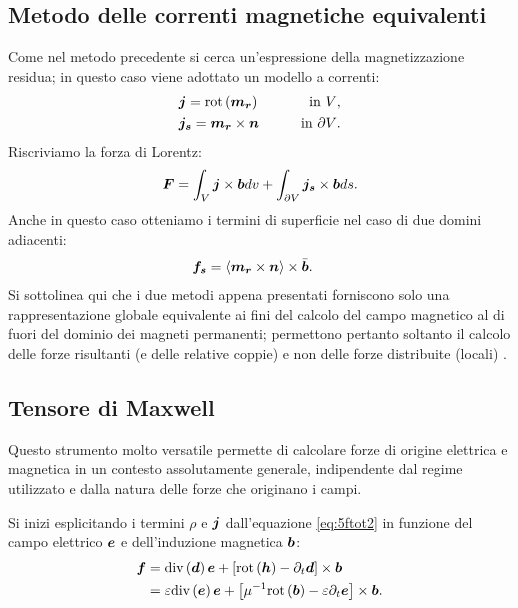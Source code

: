 \subsection{Metodo delle correnti magnetiche equivalenti} Come nel metodo precedente si cerca un'espressione della magnetizzazione residua; in questo caso viene adottato un modello a correnti:
\begin{align}
\label{eq:5correnti_eq1a}
&\boldsymbol{j} =\text{rot}\left(\boldsymbol{m_r}\right) \qquad  &\text{in $V$,}\\
\label{eq:5correnti_eq1b}
&\boldsymbol{j_s} =\boldsymbol{m_r}\times \boldsymbol{n} \qquad &\text{in $\partial V$.}
\end{align}
Riscriviamo la forza di Lorentz:
\begin{equation}
\label{eq:5currentf}
\boldsymbol{F} = \int_V \boldsymbol{j}\times\boldsymbol{b} dv+\int_{\partial V} \boldsymbol{j_s} \times \boldsymbol{b} ds. 
\end{equation}
Anche in questo caso otteniamo i termini di superficie nel caso di due domini adiacenti:
\begin{align}
\label{eq:5currentf2}
\boldsymbol{f_{s}}&=\langle\boldsymbol{m_{r}}\times\boldsymbol{n}\rangle\times\bar{\boldsymbol{b}}.
\end{align}
Si sottolinea qui che i due metodi appena presentati forniscono solo una rappresentazione globale equivalente ai fini del calcolo del campo magnetico al di fuori del dominio dei magneti permanenti; permettono pertanto soltanto il calcolo delle forze risultanti (e delle relative coppie) e non delle forze distribuite (locali) \citep{de_medeiros_about_1999}.
\subsection{Tensore di Maxwell} Questo strumento molto versatile permette di calcolare forze di origine elettrica e magnetica in un contesto assolutamente generale, indipendente dal regime utilizzato e dalla natura delle forze che originano i campi.

Si inizi esplicitando i termini $\rho$ e $\boldsymbol{j}$ dall'equazione \eqref{eq:5ftot2} in funzione del campo elettrico $\boldsymbol{e}$ e dell'induzione magnetica $\boldsymbol{b}$:
\begin{align}
\label{eq:5maxf1}
\boldsymbol{f}&=\text{div}\left(\boldsymbol{d}\right) \boldsymbol{e} +\left[\text{rot}\left(\boldsymbol{h}\right)-\partial_t \boldsymbol{d}\right]\times \boldsymbol{b}\nonumber\\
&=\varepsilon\text{div}\left(\boldsymbol{e}\right) \boldsymbol{e} +\left[\mu^{-1}\text{rot}\left(\boldsymbol{b}\right)-\varepsilon\partial_t \boldsymbol{e}\right]\times \boldsymbol{b}.
\end{align}

